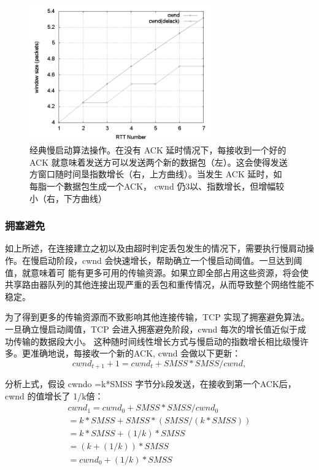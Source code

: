 \begin{figure}[!htb]
    \centering
	\includegraphics[width=0.7\textwidth]{imgs/16/16-3.png}
	\caption{经典慢启动算法操作。在没有 ACK 延时情况下，每接收到一个好的ACK 就意味着发送方可以发送两个新的数据包（左）。这会使得发送方窗口随时间垦指数增长（右，上方曲线）。当发生
    ACK 延时，如每脂一个數据包生成一个ACK， cwnd 仍3以、指数增长，但增幅较小（右，下方曲线）}
\end{figure}

\subsubsection{拥塞避免}
如上所述，在连接建立之初以及由超时判定丢包发生的情况下，需要执行慢肩动操作。在慢启动阶段，cwnd 会快速增长，帮助确立一个慢启动阈值。一旦达到阈值，就意味着可
能有更多可用的传输资源。如果立即全部占用这些资源，将会使共享路由器队列的其他连接出现严重的丢包和重传情况，从而导致整个网络性能不稳定。

为了得到更多的传输资源而不致影响其他连接传输，TCP 实现了拥塞避免算法。一旦确立慢启动阈值，TCP 会进入拥塞避免阶段，cwnd 每次的增长值近似于成功传输的数据段大小。
这种随时间线性增长方式与慢启动的指数增长相比级慢许多。更准确地说，每接收一个新的ACK, cwnd 会做以下更新：
\begin{equation}
    cwnd_{t+1} + 1 = cwnd_{t} + SMSS * SMSS/cwnd,
\end{equation}

分析上式，假设 cwndo =k*SMSS 字节分k段发送，在接收到第一个ACK后，cwnd 的值增长了 1/k倍：
\begin{equation}
    \begin{split}
        cwnd_{1} = cwnd_{0} + SMSS*SMSS/cwnd_{0}\\ = k*SMSS + SMSS * (SMSS/ (k * SMSS) )\\ = k * SMSS + (1/k) *SMSS\\ = (k + (1/k)) *SMSS\\ = cwnd_{0} + (1/k) *SMSS
    \end{split}
\end{equation}

